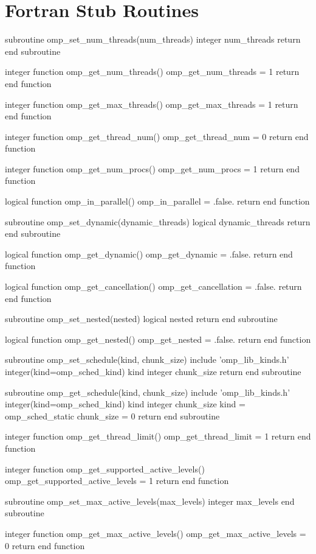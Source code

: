 \section{Fortran Stub Routines}
\label{sec:Fortran Stub Routines}
{\small \begin{ompfFunction}
subroutine omp_set_num_threads(num_threads)
  integer num_threads
  return
end subroutine

integer function omp_get_num_threads()
  omp_get_num_threads = 1
  return
end function

integer function omp_get_max_threads()
  omp_get_max_threads = 1
  return
end function

integer function omp_get_thread_num()
  omp_get_thread_num = 0
  return
end function

integer function omp_get_num_procs()
  omp_get_num_procs = 1
  return
end function

logical function omp_in_parallel()
  omp_in_parallel = .false.
  return
end function

subroutine omp_set_dynamic(dynamic_threads)
  logical dynamic_threads
  return
end subroutine

logical function omp_get_dynamic()
  omp_get_dynamic = .false.
  return
end function

logical function omp_get_cancellation()
  omp_get_cancellation = .false.
  return
end function

subroutine omp_set_nested(nested)
  logical nested
  return
end subroutine

logical function omp_get_nested()
  omp_get_nested = .false.
  return
end function

subroutine omp_set_schedule(kind, chunk_size)
  include 'omp_lib_kinds.h'
  integer(kind=omp_sched_kind) kind
  integer chunk_size
  return
end subroutine

subroutine omp_get_schedule(kind, chunk_size)
  include 'omp_lib_kinds.h'
  integer(kind=omp_sched_kind) kind
  integer chunk_size
  kind = omp_sched_static
  chunk_size = 0
  return
end subroutine

integer function omp_get_thread_limit()
  omp_get_thread_limit = 1
  return
end function

integer function omp_get_supported_active_levels()
  omp_get_supported_active_levels = 1
  return
end function

subroutine omp_set_max_active_levels(max_levels)
  integer max_levels
end subroutine

integer function omp_get_max_active_levels()
  omp_get_max_active_levels = 0
  return
end function


\end{ompfFunction}}
